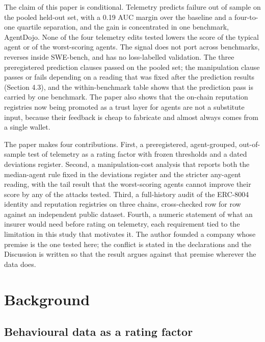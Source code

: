 \documentclass[
  11pt,
  a4paper,
]{article}
\begin{document}
The claim of this paper is conditional. Telemetry predicts failure out
of sample on the pooled held-out set, with a 0.19 AUC margin over the
baseline and a four-to-one quartile separation, and the gain is
concentrated in one benchmark, AgentDojo. None of the four telemetry
edits tested lowers the score of the typical agent or of the
worst-scoring agents. The signal does not port across benchmarks,
reverses inside SWE-bench, and has no loss-labelled validation. The
three preregistered prediction clauses passed on the pooled set; the
manipulation clause passes or fails depending on a reading that was
fixed after the prediction results (Section 4.3), and the
within-benchmark table shows that the prediction pass is carried by one
benchmark. The paper also shows that the on-chain reputation registries
now being promoted as a trust layer for agents are not a substitute
input, because their feedback is cheap to fabricate and almost always
comes from a single wallet.

The paper makes four contributions. First, a preregistered,
agent-grouped, out-of-sample test of telemetry as a rating factor with
frozen thresholds and a dated deviations register. Second, a
manipulation-cost analysis that reports both the median-agent rule fixed
in the deviations register and the stricter any-agent reading, with the
tail result that the worst-scoring agents cannot improve their score by
any of the attacks tested. Third, a full-history audit of the ERC-8004
identity and reputation registries on three chains, cross-checked row
for row against an independent public dataset. Fourth, a numeric
statement of what an insurer would need before rating on telemetry, each
requirement tied to the limitation in this study that motivates it. The
author founded a company whose premise is the one tested here; the
conflict is stated in the declarations and the Discussion is written so
that the result argues against that premise wherever the data does.

\hypertarget{background}{%
\section{Background}\label{background}}

\hypertarget{behavioural-data-as-a-rating-factor}{%
\subsection{Behavioural data as a rating
factor}\label{behavioural-data-as-a-rating-factor}}
\end{document}
